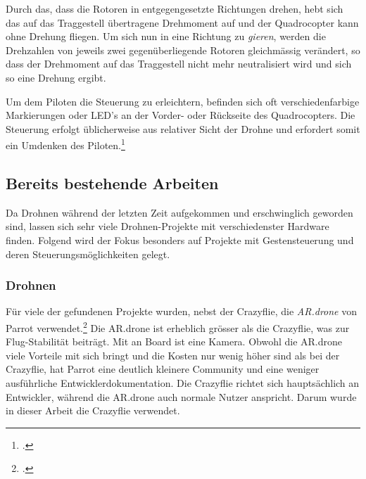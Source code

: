 Durch das, dass die Rotoren in entgegengesetzte Richtungen drehen, hebt sich das auf das Traggestell übertragene Drehmoment auf und der Quadrocopter kann ohne Drehung fliegen.
Um sich nun in eine Richtung zu \textit{gieren}, werden die Drehzahlen von jeweils zwei gegenüberliegende Rotoren gleichmässig verändert, so dass der Drehmoment auf das Traggestell nicht mehr neutralisiert wird und sich so eine Drehung ergibt.

Um dem Piloten die Steuerung zu erleichtern, befinden sich oft verschiedenfarbige Markierungen oder LED's an der Vorder- oder Rückseite des Quadrocopters.
Die Steuerung erfolgt üblicherweise aus relativer Sicht der Drohne und erfordert somit ein Umdenken des Piloten.\footcite{Quadrocopter__Wikipedia_2015-03-22}


\subsection{Bereits bestehende Arbeiten}
Da Drohnen während der letzten Zeit aufgekommen und erschwinglich geworden sind, lassen sich sehr viele Drohnen-Projekte mit verschiedenster Hardware finden.
Folgend wird der Fokus besonders auf Projekte mit Gestensteuerung und deren Steuerungsmöglichkeiten gelegt.


\subsubsection{Drohnen}
Für viele der gefundenen Projekte wurden, nebst der Crazyflie, die \textit{AR.drone} von Parrot verwendet.\footcite{AR_Drone_2.0_Parrot_2015-04-29}
Die AR.drone ist erheblich grösser als die Crazyflie, was zur Flug-Stabilität beiträgt. 
Mit an Board ist eine Kamera.
Obwohl die AR.drone viele Vorteile mit sich bringt und die Kosten nur wenig höher sind als bei der Crazyflie, hat Parrot eine deutlich kleinere Community und eine weniger ausführliche Entwicklerdokumentation.
Die Crazyflie richtet sich hauptsächlich an Entwickler, während die AR.drone auch normale Nutzer anspricht.
Darum wurde in dieser Arbeit die Crazyflie verwendet.

